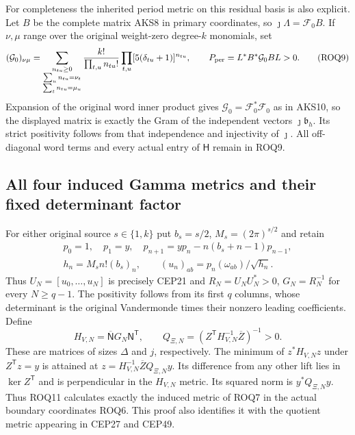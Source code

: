 \documentclass[11pt,a4paper]{article}
\begin{document}
For completeness the inherited period metric on this residual basis is
also explicit. Let $B$ be the complete matrix AKS8 in primary
coordinates, so $\jmath\Lambda=\mathcal F_0B$. If $\nu,\mu$ range over
the original weight-zero degree-$k$ monomials, set
\[
 (\mathcal G_0)_{\nu\mu}
 =\sum_{\substack{n_{tu}\ge0\\\sum_u n_{tu}=\nu_t\\
                                      \sum_t n_{tu}=\mu_u}}
       \frac{k!}{\prod_{t,u}n_{tu}!}
               \prod_{t,u}[5(\delta_{tu}+1)]^{n_{tu}},
 \qquad P_{\rm per}=L^*B^*\mathcal G_0BL>0.
 \tag{ROQ9}
\]
Expansion of the original word inner product gives
$\mathcal G_0=\mathcal F_0^*\mathcal F_0$ as in AKS10, so the displayed
matrix is exactly the Gram of the independent vectors
$\jmath\mathfrak b_h$. Its strict positivity follows from that
independence and injectivity of $\jmath$. All off-diagonal word terms
and every actual entry of $\mathsf H$ remain in ROQ9.

\subsection{All four induced Gamma metrics and their fixed determinant factor}

For either original source $s\in\{1,k\}$ put
$b_s=s/2$, $M_s=(2\pi)^{s/2}$ and retain
\[
 \begin{gathered}
 p_0=1,\quad p_1=y,\quad
 p_{n+1}=yp_n-n(b_s+n-1)p_{n-1},\\
 h_n=M_s n!(b_s)_n,
 \qquad (u_n)_{ab}=p_n(\omega_{ab})/\sqrt{h_n}.
 \end{gathered}
 \tag{ROQ10}
\]
Thus $U_N=[u_0,\ldots,u_N]$ is precisely CEP21 and
$R_N=U_NU_N^*>0$, $G_N=R_N^{-1}$ for every $N\ge q-1$.
The positivity follows from its first $q$ columns, whose determinant
is the original Vandermonde times their nonzero leading coefficients.
Define
\[
 H_{V,N}=\overline{\mathsf N}G_N\mathsf N^{\mathsf T},\qquad
 Q_{\Xi,N}=
       (Z^{\mathsf T}H_{V,N}^{-1}\overline Z)^{-1}>0.
 \tag{ROQ11}
\]
These are matrices of sizes $\Delta$ and $j$, respectively. The
minimum of $z^*H_{V,N}z$ under $Z^{\mathsf T}z=y$ is attained at
$z=H_{V,N}^{-1}\overline ZQ_{\Xi,N}y$. Its difference from any other
lift lies in $\ker Z^{\mathsf T}$ and is perpendicular in the
$H_{V,N}$ metric. Its squared norm is $y^*Q_{\Xi,N}y$.
Thus ROQ11 calculates exactly the induced metric of ROQ7 in the
actual boundary coordinates ROQ6. This proof also identifies it with
the quotient metric appearing in CEP27 and CEP49.
\end{document}
